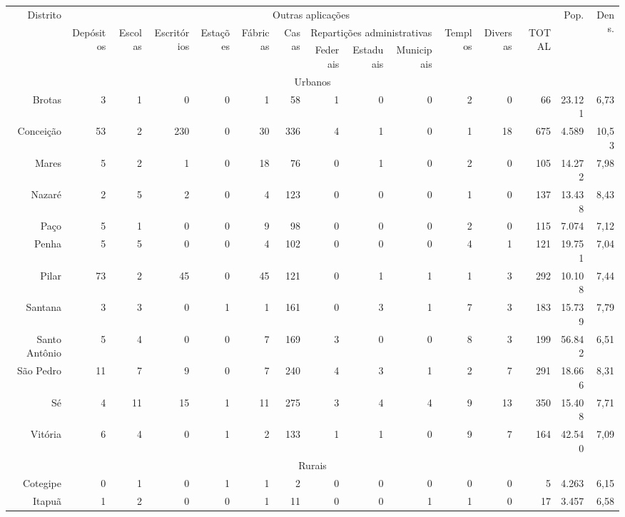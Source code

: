 \begin{sidewaystable}[!htp]
\centering
{}
{
\begin{tiny}
\begin{tabular}{rrrrrrrrrrrrrrr}
\hline
\multirow{3}{*}{Distrito} & \multicolumn{12}{c}{Outras aplicações} & \multirow{3}{*}{Pop.} & \multirow{3}{*}{Dens.} \\
\cline{2-13}
 & \multirow{2}{*}{Depósitos} & \multirow{2}{1cm}{Escolas} & \multirow{2}{*}{Escritórios} & \multirow{2}{*}{Estações} & \multirow{2}{*}{Fábricas} & \multirow{2}{*}{Casas} & \multicolumn{3}{c}{Repartições administrativas} & \multirow{2}{*}{Templos} & \multirow{2}{*}{Diversas} & \multirow{2}{*}{TOTAL} & & \\
\cline{8-10} & & & & & ou oficinas & de negócio & Federais & Estaduais & Municipais & & & & & \\
\hline
\multicolumn{15}{c}{Urbanos} \\
\hline
Brotas	&3	&1	&0	&0	&1	&58	&1	&0	&0	&2	&0	&66	&23.121	&6,73 \\
Conceição	&53	&2	&230	&0	&30	&336	&4	&1	&0	&1	&18	&675	&4.589	&10,53 \\
Mares	&5	&2	&1	&0	&18	&76	&0	&1	&0	&2	&0	&105	&14.272	&7,98 \\
Nazaré	&2	&5	&2	&0	&4	&123	&0	&0	&0	&1	&0	&137	&13.438	&8,43 \\
Paço	&5	&1	&0	&0	&9	&98	&0	&0	&0	&2	&0	&115	&7.074	&7,12 \\
Penha	&5	&5	&0	&0	&4	&102	&0	&0	&0	&4	&1	&121	&19.751	&7,04 \\
Pilar	&73	&2	&45	&0	&45	&121	&0	&1	&1	&1	&3	&292	&10.108	&7,44 \\
Santana	&3	&3	&0	&1	&1	&161	&0	&3	&1	&7	&3	&183	&15.739	&7,79 \\
Santo Antônio	&5	&4	&0	&0	&7	&169	&3	&0	&0	&8	&3	&199	&56.842	&6,51 \\
São Pedro	&11	&7	&9	&0	&7	&240	&4	&3	&1	&2	&7	&291	&18.666	&8,31 \\
Sé	&4	&11	&15	&1	&11	&275	&3	&4	&4	&9	&13	&350	&15.408	&7,71 \\
Vitória	&6	&4	&0	&1	&2	&133	&1	&1	&0	&9	&7	&164	&42.540	&7,09 \\
\hline
\multicolumn{15}{c}{Rurais} \\
\hline
Cotegipe	&0	&1	&0	&1	&1	&2	&0	&0	&0	&0	&0	&5	&4.263	&6,15 \\
Itapuã	&1	&2	&0	&0	&1	&11	&0	&0	&1	&1	&0	&17	&3.457	&6,58 \\

\end{tabular}
\end{tiny}}
\end{sidewaystable}
